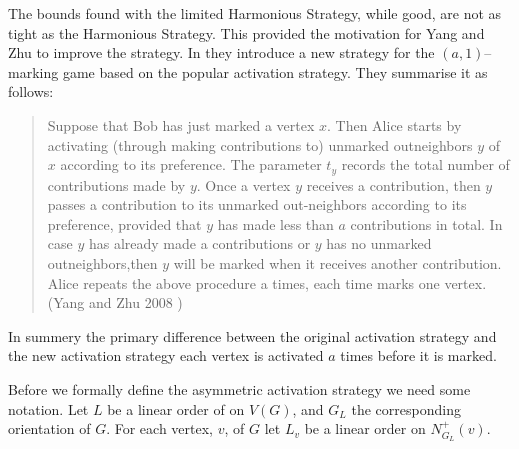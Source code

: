 The bounds found with the limited Harmonious Strategy, while good, are not as tight as the Harmonious Strategy. This provided the motivation for Yang and Zhu to improve the strategy. In \cite{yangZhu2008} they introduce a new strategy for the $(a,1)$--marking game based on the popular activation strategy. They summarise it as follows:

\begin{quotation}
    Suppose that Bob has just marked a vertex $x$. Then Alice starts by activating (through making contributions to) unmarked outneighbors $y$ of $x$ according to its preference. The parameter $t_y$ records the total number of contributions made by $y$. Once a vertex $y$ receives a contribution, then $y$ passes a contribution to its unmarked out-neighbors according to its preference, provided that $y$ has made less than $a$ contributions in total. In case $y$ has already made a contributions or $y$ has no unmarked outneighbors,then $y$ will be marked when it receives another contribution. Alice repeats the above procedure a times, each time marks one vertex. (Yang and Zhu 2008 \cite{yangZhu2008})
\end{quotation}

In summery the primary difference between the original activation strategy and the new activation strategy each vertex is activated $a$ times before it is marked.

Before we formally define the asymmetric activation strategy we need some notation. Let $L$ be a linear order of on $V(G)$, and $G_L$ the corresponding orientation of $G$. For each vertex, $v$, of $G$ let $L_v$ be a linear order on $N^+_{G_L}(v)$. 

